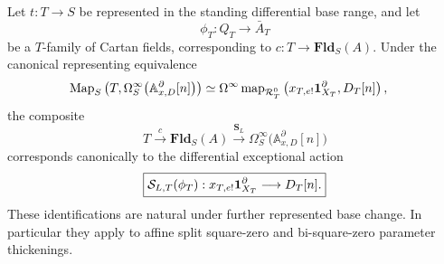 \begin{proposition}
\label{prop:var-action-smooth-parameter}
Let \(t:T\to S\) be represented in the standing differential base range, and let
\[
    \phi_T:Q_T\longrightarrow\bar A_T
\]
be a \(T\)-family of Cartan fields, corresponding to \(c:T\to\mathbf{Fld}_S(A)\). Under the canonical representing equivalence
\[
\begin{aligned}
    \operatorname{Map}_S\left(
      T,
      \Omega_S^\infty\bigl(\mathbb A^\partial_{x,D}[n]\bigr)
    \right)
    &\simeq
    \Omega^\infty
    \operatorname{map}_{\mathcal R_T^0}
    \left(
      x_{T,e!}\mathbf 1_{X_T}^\partial,
      D_T[n]
    \right),
\end{aligned}
\]
the composite
\[
    T
    \xrightarrow{c}
    \mathbf{Fld}_S(A)
    \xrightarrow{\mathbf S_L}
    \Omega_S^\infty\bigl(\mathbb A^\partial_{x,D}[n]\bigr)
\]
corresponds canonically to the differential exceptional action
\[
    \boxed{
    \mathcal S_{L,T}(\phi_T):
    x_{T,e!}\mathbf 1_{X_T}^\partial
    \longrightarrow
    D_T[n].
    }
\]
These identifications are natural under further represented base change. In particular they apply to affine split square-zero and bi-square-zero parameter thickenings.
\end{proposition}

